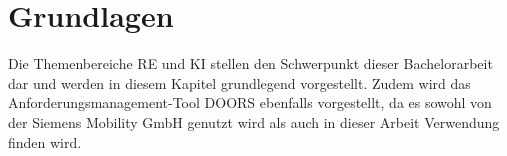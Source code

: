 \chapter{Grundlagen}
\label{chap:kapitel2}
Die Themenbereiche \ac{RE} und \ac{KI} stellen den Schwerpunkt dieser Bachelorarbeit dar und werden in diesem Kapitel grundlegend vorgestellt.
Zudem wird das Anforderungsmanagement-Tool \ac{DOORS} ebenfalls vorgestellt, da es sowohl von der Siemens Mobility GmbH genutzt wird als auch 
in dieser Arbeit Verwendung finden wird.





